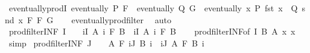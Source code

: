 \begin{isabellebody}
\endisatagproof
{\isafoldproof}%
%
\isadelimproof
\isanewline
%
\endisadelimproof
\isanewline
{}\isamarkupfalse%
\ eventually{\isacharunderscore}{\kern0pt}prodI{\isacharcolon}{\kern0pt}\ {\isachardoublequoteopen}eventually\ P\ F\ {\isasymLongrightarrow}\ eventually\ Q\ G\ {\isasymLongrightarrow}\ eventually\ {\isacharparenleft}{\kern0pt}{\isasymlambda}x{\isachardot}{\kern0pt}\ P\ {\isacharparenleft}{\kern0pt}fst\ x{\isacharparenright}{\kern0pt}\ {\isasymand}\ Q\ {\isacharparenleft}{\kern0pt}snd\ x{\isacharparenright}{\kern0pt}{\isacharparenright}{\kern0pt}\ {\isacharparenleft}{\kern0pt}F\ {\isasymtimes}\isactrlsub F\ G{\isacharparenright}{\kern0pt}{\isachardoublequoteclose}\isanewline
%
\isadelimproof
\ \ %
\endisadelimproof
%
\isatagproof
{}\isamarkupfalse%
\ eventually{\isacharunderscore}{\kern0pt}prod{\isacharunderscore}{\kern0pt}filter\ \isamarkupfalse%
\ auto%
\endisatagproof
{\isafoldproof}%
%
\isadelimproof
\isanewline
%
\endisadelimproof
\isanewline
{}\isamarkupfalse%
\ prod{\isacharunderscore}{\kern0pt}filter{\isacharunderscore}{\kern0pt}INF{}{\isacharcolon}{\kern0pt}\ {\isachardoublequoteopen}I\ {\isasymnoteq}\ {\isacharbraceleft}{\kern0pt}{\isacharbraceright}{\kern0pt}\ {\isasymLongrightarrow}\ {\isacharparenleft}{\kern0pt}{\isasymSqinter}i{\isasymin}I{\isachardot}{\kern0pt}\ A\ i{\isacharparenright}{\kern0pt}\ {\isasymtimes}\isactrlsub F\ B\ {\isacharequal}{\kern0pt}\ {\isacharparenleft}{\kern0pt}{\isasymSqinter}i{\isasymin}I{\isachardot}{\kern0pt}\ A\ i\ {\isasymtimes}\isactrlsub F\ B{\isacharparenright}{\kern0pt}{\isachardoublequoteclose}\isanewline
%
\isadelimproof
\ \ %
\endisadelimproof
%
\isatagproof
{}\isamarkupfalse%
\ prod{\isacharunderscore}{\kern0pt}filter{\isacharunderscore}{\kern0pt}INF{\isacharbrackleft}{\kern0pt}of\ I\ {\isachardoublequoteopen}{\isacharbraceleft}{\kern0pt}B{\isacharbraceright}{\kern0pt}{\isachardoublequoteclose}\ A\ {\isachardoublequoteopen}{\isasymlambda}x{\isachardot}{\kern0pt}\ x{\isachardoublequoteclose}{\isacharbrackright}{\kern0pt}\ \isamarkupfalse%
\ simp%
\endisatagproof
{\isafoldproof}%
%
\isadelimproof
\isanewline
%
\endisadelimproof
\isanewline
{}\isamarkupfalse%
\ prod{\isacharunderscore}{\kern0pt}filter{\isacharunderscore}{\kern0pt}INF{}{\isacharcolon}{\kern0pt}\ {\isachardoublequoteopen}J\ {\isasymnoteq}\ {\isacharbraceleft}{\kern0pt}{\isacharbraceright}{\kern0pt}\ {\isasymLongrightarrow}\ A\ {\isasymtimes}\isactrlsub F\ {\isacharparenleft}{\kern0pt}{\isasymSqinter}i{\isasymin}J{\isachardot}{\kern0pt}\ B\ i{\isacharparenright}{\kern0pt}\ {\isacharequal}{\kern0pt}\ {\isacharparenleft}{\kern0pt}{\isasymSqinter}i{\isasymin}J{\isachardot}{\kern0pt}\ A\ {\isasymtimes}\isactrlsub F\ B\ i{\isacharparenright}{\kern0pt}{\isachardoublequoteclose}\isanewline

\end{isabellebody}
